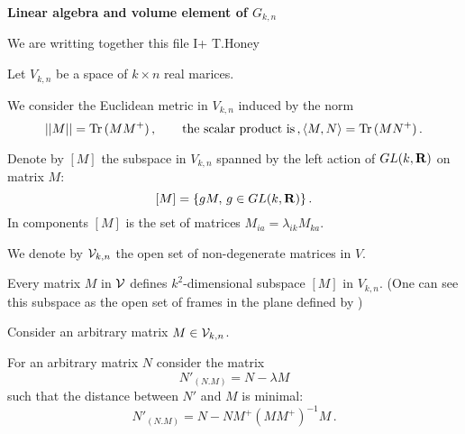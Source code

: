 \baselineskip=14pt
\def\vare {\varepsilon}
\def\A {{\bf A}}
\def\t {\tilde}
\def\a {\alpha}
\def\K {{\bf K}}
\def\N {{\bf N}}
\def\V {{\cal V}}
\def\s {{\sigma}}
\def\S {{\Sigma}}
\def\s {{\sigma}}
\def\p{\partial}
\def\vare{{\varepsilon}}
\def\Q {{\bf Q}}
\def\D {{\cal D}}
\def\G {{\Gamma}}
\def\C {{\bf C}}
\def\M {{\cal M}}
\def\Z {{\bf Z}}
\def\U  {{\cal U}}
\def\H {{\cal H}}
\def\R  {{\bf R}}
\def\S  {{\bf S}}
\def\E  {{\bf E}}
\def\l {\lambda}
\def\ll {{\bf l}}
\def\degree {{\bf {\rm degree}\,\,}}
\def \finish {${\,\,\vrule height1mm depth2mm width 8pt}$}
\def \m {\medskip}
\def\p {\partial}
\def\r {{\bf r}}
\def\pt {{\bf p}}
\def\v {{\bf v}}
\def\n {{\bf n}}
\def\t {{\bf t}}
\def\b {{\bf b}}
\def\c {{\bf c }}
\def\e{{\bf e}}
\def\ac {{\bf a}}
\def \X   {{\bf X}}
\def \Y   {{\bf Y}}
\def \x   {{\bf x}}
\def \y   {{\bf y}}
\def \G{{\cal G}}
\def\w {{\omega}}
\def \Tr  {{\rm Tr\,}}
\def\V {{\cal V}}


\centerline {\bf Linear algebra and volume element of $G_{k,n}$}


\centerline {We are  writting together this file I+ T.Honey}


\bigskip

   Let $V_{k,n}$ be a space of $k\times n$ real marices.

 We consider the Euclidean metric in $V_{k,n}$ induced by the norm
                 $$
              ||M||=\Tr (MM^+)\,,\qquad
\hbox{the scalar product is}\,, \langle M,N\rangle=\Tr (MN^+)\,.
                 $$

Denote by $[M]$ the subspace in $V_{k,n}$ spanned by the left action
of $GL(k,\R)$ on matrix $M$:
                       $$
  [M]=\{gM,\, g\in GL(k,\R)\}\,. 
                       $$
In components $[M]$ is the set of matrices $M_{ia}=\lambda_{ik}M_{ka}$.


We denote by $\V_{k,n}$ the open set of non-degenerate matrices in $V$.
          
Every matrix $M$ in $\V$ defines $k^2$-dimensional subspace $[M]$ 
in $V_{k,n}$.
(One can see this subspace as the open set of frames in the plane 
defined by )

 
Consider an arbitrary matrix $M\in \V_{k,n}$.

For an arbitrary matrix $N$ consider the matrix
        $$
         N'_{(N.M)}=N-\lambda M
                   $$
           such that the distance between $N'$ and $M$ is minimal:
             $$
         N'_{(N.M)}=N-NM^+(MM^+)^{-1}M\,.
             $$ 

